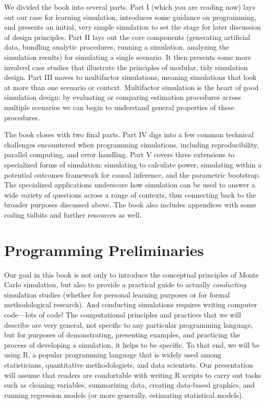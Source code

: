 \documentclass[
]{book}
\begin{document}
We divided the book into several parts.
Part I (which you are reading now) lays out our case for learning simulation, introduces some guidance on programming, and presents an initial, very simple simulation to set the stage for later discussion of design principles.
Part II lays out the core components (generating artificial data, bundling analytic procedures, running a simulation, analyzing the simulation results) for simulating a single scenario. It then presents some more involved case studies that illustrate the principles of modular, tidy simulation design.
Part III moves to multifactor simulations, meaning simulations that look at more than one scenario or context.
Multifactor simulation is the heart of good simulation design: by evaluating or comparing estimation procedures across multiple scenarios we can begin to understand general properties of these procedures.

The book closes with two final parts.
Part IV digs into a few common technical challenges encountered when programming simulations, including reproducibility, parallel computing, and error handling.
Part V covers three extensions to specialized forms of simulation: simulating to calculate power, simulating within a potential outcomes framework for causal inference, and the parametric bootstrap. The specialized applications underscore how simulation can be used to answer a wide variety of questions across a range of contexts, thus connecting back to the broader purposes discussed above.
The book also includes appendices with some coding tidbits and further resources as well.

\chapter{Programming Preliminaries}\label{programming-preliminaries}

Our goal in this book is not only to introduce the conceptual principles of Monte Carlo simulation, but also to provide a practical guide to actually \emph{conducting} simulation studies (whether for personal learning purposes or for formal methodological research).
And conducting simulations requires writing computer code---lots of code!
The computational principles and practices that we will describe are very general, not specific to any particular programming language, but for purposes of demonstrating, presenting examples, and practicing the process of developing a simulation, it helps to be specific.
To that end, we will be using R, a popular programming language that is widely used among statisticians, quantitative methodologists, and data scientists.
Our presentation will assume that readers are comfortable with writing R scripts to carry out tasks such as cleaning variables, summarizing data, creating data-based graphics, and running regression models (or more generally, estimating statistical models).
\end{document}
